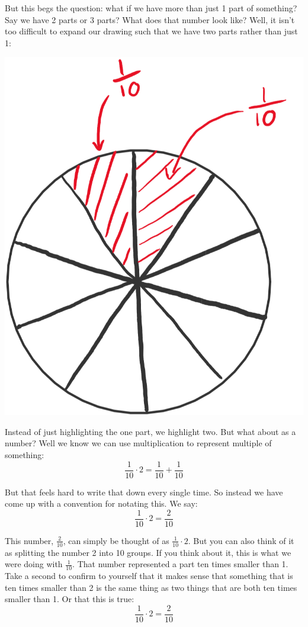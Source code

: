 \documentclass{article}
\begin{document}
But this begs the question: what if we have more than just 1 part of something? Say we have 2 parts or 3 parts? What does that number look like? 
Well, it isn't too difficult to expand our drawing such that we have two parts rather than just 1: 
\begin{center}
    \includegraphics[scale=0.52]{chapter5_draw2.png}
\end{center}

Instead of just highlighting the one part, we highlight two. But what about as a number? Well we know we can use multiplication to represent multiple of something: 
\[ \frac{1}{10} \cdot 2 = \frac{1}{10} + \frac{1}{10} \]

But that feels hard to write that down every single time. So instead we have come up with a convention for notating this. We say: 
\[ \frac{1}{10} \cdot 2 = \frac{2}{10} \]

This number, $\frac{2}{10}$, can simply be thought of as $\frac{1}{10} \cdot 2$. But you can also think of it as splitting the number 2 into 10 groups. 
If you think about it, this is what we were doing with $\frac{1}{10}$. That number represented a part ten times smaller than 1.
Take a second to confirm to yourself that it makes sense that something that is ten times smaller than 2 is the same thing as two things that are both ten times smaller than 1. Or that this is true: 
\[ \frac{1}{10} \cdot 2 = \frac{2}{10} \]
\end{document}
